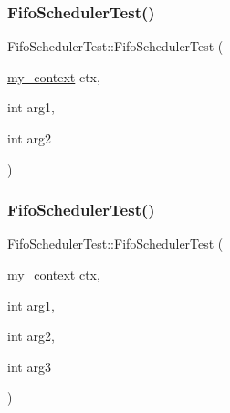 \mbox{\label{struct_fifo_scheduler_test_acbfc86a2b37ae1288d9153490dad2b0d}} 
\subsubsection{\texorpdfstring{Fifo\+Scheduler\+Test()}{FifoSchedulerTest()}\hspace{0.1cm}{\footnotesize\ttfamily [3/7]}}
{\footnotesize\ttfamily Fifo\+Scheduler\+Test\+::\+Fifo\+Scheduler\+Test (\begin{DoxyParamCaption}\item[{\mbox{\hyperlink{classboost_1_1statechart_1_1event__processor_a99f1c6ec8419ec82f140c5c93c5eb8cd}{my\+\_\+context}}}]{ctx,  }\item[{int}]{arg1,  }\item[{int}]{arg2 }\end{DoxyParamCaption})\hspace{0.3cm}{\ttfamily [inline]}}

\mbox{\label{struct_fifo_scheduler_test_a985330aa351673bdeb18b32209831176}} 
\subsubsection{\texorpdfstring{Fifo\+Scheduler\+Test()}{FifoSchedulerTest()}\hspace{0.1cm}{\footnotesize\ttfamily [4/7]}}
{\footnotesize\ttfamily Fifo\+Scheduler\+Test\+::\+Fifo\+Scheduler\+Test (\begin{DoxyParamCaption}\item[{\mbox{\hyperlink{classboost_1_1statechart_1_1event__processor_a99f1c6ec8419ec82f140c5c93c5eb8cd}{my\+\_\+context}}}]{ctx,  }\item[{int}]{arg1,  }\item[{int}]{arg2,  }\item[{int}]{arg3 }\end{DoxyParamCaption})\hspace{0.3cm}{\ttfamily [inline]}}

